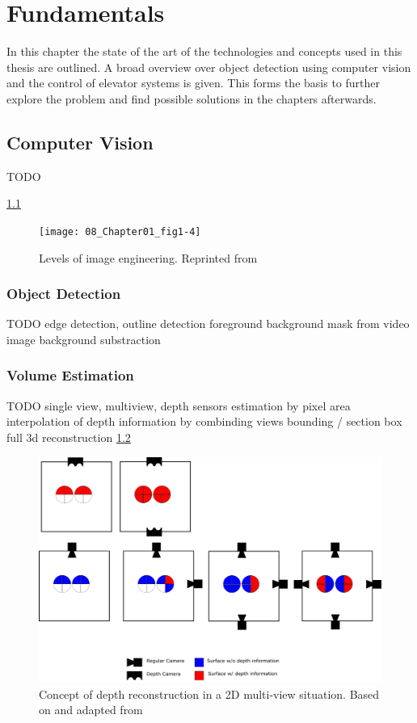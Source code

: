 \chapter{Fundamentals}
\label{chap:sota}
In this chapter the state of the art of the technologies and concepts used in this thesis are outlined.
A broad overview over object detection using computer vision and the control of elevator systems is given.
This forms the basis to further explore the problem and find possible solutions in the chapters afterwards.

\section{Computer Vision}

TODO

\ref{fig:sota:imageengineering}
\begin{figure}[hbt]
	\centering
	\texttt{[image: 08\_Chapter01\_fig1-4]}
	\caption{\label{fig:sota:imageengineering} Levels of image engineering. 
	Reprinted from \textcite[][Chapter~1]{zhang2017imageprocessing}}
\end{figure}

\subsection{Object Detection}

TODO
edge detection, outline detection
foreground background mask from video image
background substraction

\subsection{Volume Estimation}

TODO
single view, multiview, depth sensors
estimation by pixel area
interpolation of depth information by combinding views
bounding / section box
full 3d reconstruction
\ref{fig:sota:mulitviewtop}

\begin{figure}[hbt]
	\centering
	\includegraphics[width=1.0\textwidth, keepaspectratio]{resources/multiview}
	\caption{\label{fig:sota:mulitviewtop}Concept of depth reconstruction in a 2D multi-view situation.
	Based on and adapted from \textcite[][]{sonaten2011volume}}
\end{figure}


